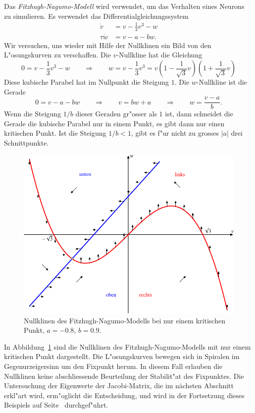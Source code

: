 \begin{beispiel}
Das {\em Fitzhugh-Nagumo-Modell} wird verwendet, um das Verhalten eines Neurons
zu simulieren.
Es verwendet das Differentialgleichungssystem
\begin{equation}
\begin{aligned}
    \dot v&= v-\frac13v^3-w\\
\tau\dot w&= v-a-bw.
\end{aligned}
\label{geometrie:fitzhugh-dgl}
\end{equation}
Wir versuchen, uns wieder mit Hilfe der Nullklinen ein Bild von den
L"osungskurven zu verschaffen.
Die $v$-Nullkline hat die Gleichung
\[
0=v-\frac13v^3-w
\qquad\Rightarrow\qquad
w=v-\frac13v^3 = v(1-{\textstyle\frac1{\sqrt{3}}}v)(1+{\textstyle\frac1{\sqrt{3}}}v)
\]
Diese kubische Parabel hat im Nullpunkt die Steigung $1$.
Die $w$-Nullkline ist die Gerade
\[
0=v-a-bw
\qquad\Rightarrow\qquad
v=bw+a
\qquad\Rightarrow\qquad
w = \frac{v-a}{b}.
\]
Wenn die Steigung $1/b$ dieser Geraden gr"osser als $1$ ist, dann schneidet
die Gerade die kubische Parabel nur in einem Punkt, es gibt dann nur
einen kritischen Punkt.
Ist die Steigung $1/b<1$, gibt es f"ur nicht zu grosses $|a|$ drei
Schnittpunkte.

\begin{figure}
\centering
\includegraphics{chapters/images/nullklinen-5.pdf}
\caption{Nullklinen des Fitzhugh-Nagumo-Modells bei nur einem kritischen Punkt,
$a=-0.8$, $b=0.9$.
\label{geometrie:nullklinen-fh-1}}
\end{figure}
In Abbildung~\ref{geometrie:nullklinen-fh-1} sind die Nullklinen des
Fitzhugh-Nagumo-Modells mit nur einem kritischen Punkt dargestellt.
Die L"osungskurven bewegen sich in Spiralen im Gegenurzeigersinn
um den Fixpunkt herum.
In diesem Fall erlauben die Nullklinen keine abschliessende Beurteilung
der Stabilit"at des Fixpunktes.
Die Untersuchung der Eigenwerte der Jacobi-Matrix, die im nächsten
Abschnitt erkl"art wird, erm"oglicht die Entscheidung, und wird in
der Fortsetzung dieses Beispiels auf Seite~\pageref{geometrie:fh-fortsetzung}
durchgef"uhrt.


\end{beispiel}
